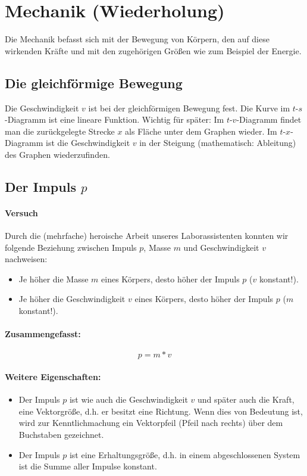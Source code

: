 	\section{Mechanik (Wiederholung)}
	Die Mechanik befasst sich mit der Bewegung von Körpern, den auf diese wirkenden Kräfte und mit den zugehörigen Größen wie zum Beispiel der Energie.
	
	\subsection{Die gleichförmige Bewegung}
	Die Geschwindigkeit $ v $ ist bei der gleichförmigen Bewegung fest. Die Kurve im $ t $-$ s $-Diagramm ist eine lineare Funktion.
	Wichtig für später: Im $ t $-$ v $-Diagramm findet man die zurückgelegte Strecke $ x $ als Fläche unter dem Graphen wieder.
	Im $ t $-$ x $-Diagramm ist die Geschwindigkeit $ v $ in der Steigung (mathematisch: Ableitung) des Graphen wiederzufinden.
	
	\subsection{Der Impuls $p$}
	\paragraph{Versuch}
	Durch die (mehrfache) heroische Arbeit unseres Laborassistenten konnten wir folgende Beziehung zwischen Impuls $ p $, Masse $ m $ und Geschwindigkeit $ v $ nachweisen:
	\begin{itemize}
		\item Je höher die Masse $ m $ eines Körpers, desto höher der Impuls $ p $ ($ v $ konstant!).
		\item Je höher die Geschwindigkeit $ v $ eines Körpers, desto höher der Impuls $ p $ ($ m $ konstant!).
	\end{itemize}
	\paragraph{Zusammengefasst:}
	\begin{equation}
		p=m*v
	\end{equation}
	\paragraph{Weitere Eigenschaften:}
	\begin{itemize}
		\item Der Impuls $ p $ ist wie auch die Geschwindigkeit $ v $ und später auch die Kraft, eine Vektorgröße, d.h. er besitzt eine Richtung. Wenn dies von Bedeutung ist, wird zur Kenntlichmachung ein Vektorpfeil (Pfeil nach rechts) über dem Buchstaben gezeichnet.
		\item Der Impuls $ p $ ist eine Erhaltungsgröße, d.h. in einem abgeschlossenen System ist die Summe aller Impulse konstant.
	\end{itemize}
	
